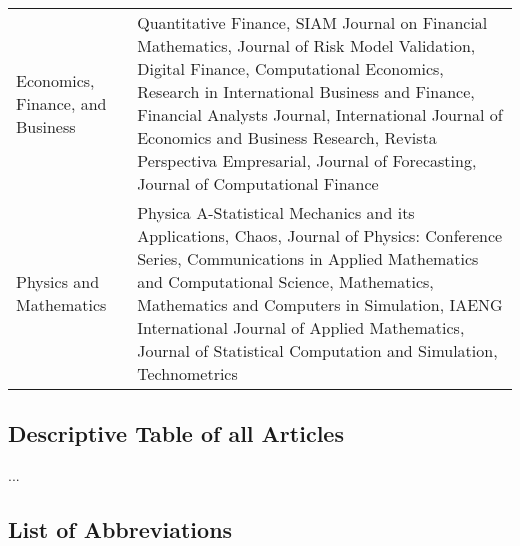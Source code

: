 \begin{table}[H]
\begin{adjustbox}{width=1\textwidth,center}
\begin{tabular}{lp{}}
        \addlinespace
        \hdashline[0.2pt/3pt]
        \addlinespace
        Economics, Finance, and Business & Quantitative Finance, SIAM Journal on Financial Mathematics, Journal of Risk Model Validation, Digital Finance, Computational Economics, Research in International Business and Finance, Financial Analysts Journal, International Journal of Economics and Business Research, Revista Perspectiva Empresarial, Journal of Forecasting, Journal of Computational Finance \\
        \addlinespace
        \hdashline[0.2pt/3pt]
        \addlinespace
        Physics and Mathematics & Physica A-Statistical Mechanics and its Applications, Chaos, Journal of Physics: Conference Series, Communications in Applied Mathematics and Computational Science, Mathematics, Mathematics and Computers in Simulation, IAENG International Journal of Applied Mathematics, Journal of Statistical Computation and Simulation, Technometrics \\
        \bottomrule
    \end{tabular}
    \end{adjustbox}
\end{table}



\subsection{Descriptive Table of all Articles}
\label{appendix:descriptive_table_of_all_articles}

...

\subsection{List of Abbreviations}
\label{appendix:list_of_abbrevations}


